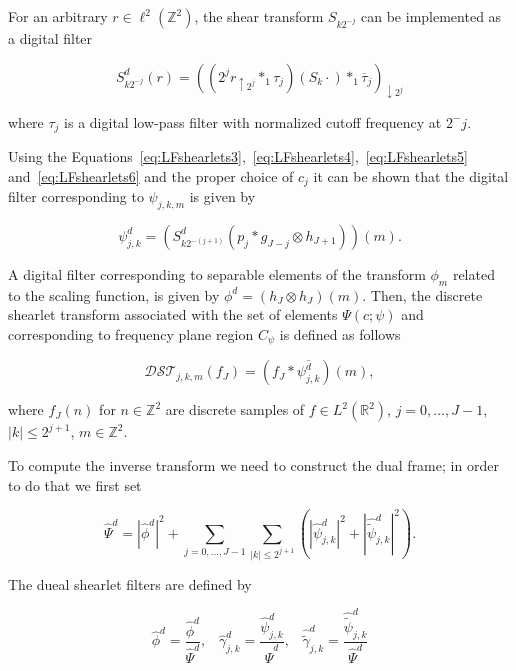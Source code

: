 \bigskip

For an arbitrary $r\in \ell^2(\mathbb{Z}^2)$, the shear transform $S_{k 2^{-j}}$ can be implemented as a digital filter

\begin{equation}
\label{eq:LFshearlets6}
S^d_{k 2^{-j}}(r)=((2^jr_{\uparrow 2^j}\ast_1\tau_j)(S_k\cdot)\ast_1\overline{\tau}_j)_{\downarrow 2^j}
\end{equation}

where $\tau_j$ is a digital low-pass filter with normalized cutoff frequency at $2^-j$. 

\bigskip

Using the Equations~\ref{eq:LFshearlets3},~\ref{eq:LFshearlets4},~\ref{eq:LFshearlets5} and~\ref{eq:LFshearlets6} and the proper choice of $c_j$ it can be shown that the digital filter corresponding to $\psi_{j,k,m}$ is given by

$$
\psi_{j,k}^d=(S^d_{k2^{-(j+1)}}(p_j\ast g_{J-j}\otimes h_{J+1}))(m).
$$

A digital filter corresponding to separable elements of the transform $\phi_m$ related to the scaling function, is given by $\phi^d=(h_J\otimes h_J)(m)$. Then, the discrete shearlet transform associated with the set of elements $\Psi(c;\psi)$ and corresponding to frequency plane region $C_{\psi}$ is defined as follows

$$
\mathcal{DST}_{j,k,m}(f_J)=(f_J\ast \overline{\psi_{j,k}^d})(m),
$$

where $f_J(n)$ for $n\in\mathbb{Z}^2$ are discrete samples of $f\in L^2(\mathbb{R}^2)$, $j=0,\ldots,J-1$, $|k|\leq 2^{j+1}$, $m\in\mathbb{Z}^2$.

\bigskip

To compute the inverse transform we need to construct the dual frame; in order to do that we first set

$$
\hat{\Psi}^d=|\hat{\phi}^d|^2+\sum_{j=0,\ldots,J-1}\sum_{|k|\leq 2^{j+1}}(|\hat{\psi}^d_{j,k}|^2+|\hat{\tilde{\psi}}_{j,k}^d|^2).
$$ 

The dueal shearlet filters are defined by

$$
\hat{\phi}^d=\frac{\hat{\phi}^d}{\hat{\Psi}^d}\textrm{,}\quad \hat{\gamma}^d_{j,k}=\frac{\hat{\psi}^d_{j,k}}{\hat{\Psi}^d}\textrm{,}\quad \hat{\tilde{\gamma}}^d_{j,k}=\frac{\hat{\tilde{\psi}}_{j,k}^d}{\hat{\Psi}^d}
$$

